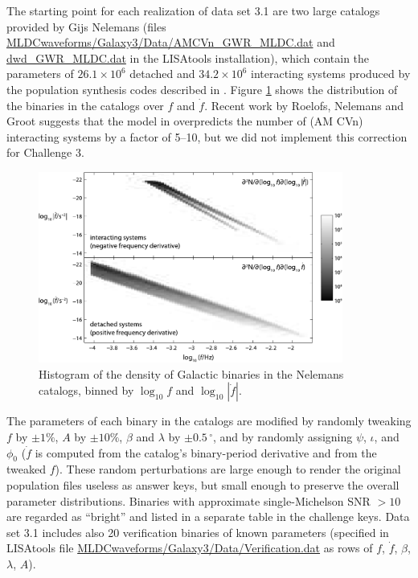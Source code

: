 \documentclass{iopart}
\begin{document}
The starting point for each realization of data set 3.1 are two large catalogs provided by Gijs Nelemans (files \url{MLDCwaveforms/Galaxy3/Data/AMCVn_GWR_MLDC.dat} and \url{dwd_GWR_MLDC.dat} in the LISAtools installation), which contain the parameters of $26.1 \times 10^6$ detached and $34.2 \times 10^6$ interacting systems produced by the population synthesis codes described in \cite{Nelemans:2001hp, Nelemans:2003ha}. Figure \ref{fig:binaries} shows the distribution of the binaries in the catalogs over $f$ and $\dot{f}$. Recent work by Roelofs, Nelemans and Groot \cite{Roelofs:2007rn} suggests that the model in \cite{Nelemans:2003ha} overpredicts the number of (AM CVn) interacting systems by a factor of 5--10, but we did not implement this correction for Challenge 3. 
%
\begin{figure}
\centerline{\includegraphics[width=10cm]{densities2b-r}}
\caption{Histogram of the density of Galactic binaries in the Nelemans catalogs, binned by $\log_{10} f$ and $\log_{10} |\dot{f}|$.\label{fig:binaries}}
\end{figure}

The parameters of each binary in the catalogs are modified by randomly tweaking $f$ by $\pm 1\%$, $A$ by $\pm 10\%$, $\beta$ and $\lambda$ by $\pm 0.5\, {}^\circ$, and by randomly assigning $\psi$, $\iota$, and $\phi_0$ ($\dot{f}$ is computed from the catalog's binary-period derivative and from the tweaked $f$). These random perturbations are large enough to render the original population files useless as answer keys, but small enough to preserve the overall parameter distributions. Binaries with approximate single-Michelson SNR $> 10$ are regarded as ``bright'' and listed in a separate table in the challenge keys. Data set 3.1 includes also 20 verification binaries of known parameters (specified in LISAtools file \url{MLDCwaveforms/Galaxy3/Data/Verification.dat} as rows of $f$, $\dot{f}$, $\beta$, $\lambda$, $A$).
\end{document}
